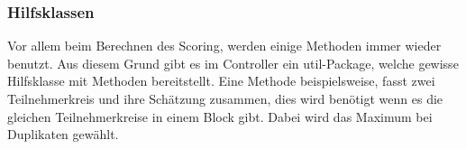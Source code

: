 \subsubsection{Hilfsklassen}
Vor allem beim Berechnen des Scoring, werden einige Methoden immer
wieder benutzt.
Aus diesem Grund gibt es im Controller ein util-Package,
welche gewisse Hilfsklasse mit Methoden bereitstellt.
Eine Methode beispielsweise, fasst zwei Teilnehmerkreis und ihre Schätzung zusammen, dies wird benötigt
wenn es die gleichen Teilnehmerkreise in einem Block gibt.
Dabei wird das Maximum bei Duplikaten gewählt.